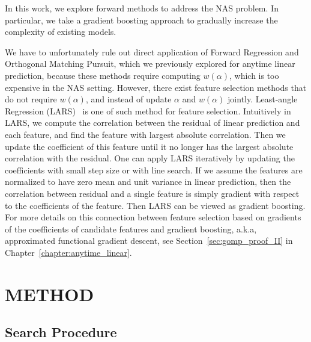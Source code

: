 In this work, we explore forward methods to address the NAS problem. 
In particular, we take a gradient boosting approach to gradually increase the
complexity of existing models. 



We have to unfortunately rule out direct application of Forward Regression and 
Orthogonal Matching Pursuit, which we previously explored for anytime linear prediction, 
because these methods require computing $w(\alpha)$, which is too expensive in the NAS setting. 
However, there exist feature selection methods that do not require $w(\alpha)$,
and instead of update $\alpha$ and $w(\alpha)$ jointly. 
Least-angle Regression (LARS)~\citep{lars} is one of such method for feature selection.
Intuitively in LARS, we compute the correlation between the residual of linear prediction and
each feature, and find the feature with largest absolute correlation. Then we update the 
coefficient of this feature until it no longer has the largest absolute correlation with the residual. 
One can apply LARS iteratively by updating the coefficients with small step size or with line search. 
If we assume the features are normalized to have zero mean and unit variance in linear prediction, 
then the correlation between residual and a single feature is simply gradient with respect to the 
coefficients of the feature. Then LARS can be viewed as gradient boosting. For more details on
this connection between feature selection based on gradients of the coefficients of candidate features and 
gradient boosting, a.k.a, approximated functional gradient descent, see Section~\ref{sec:gomp_proof_II} in 
Chapter~\ref{chapter:anytime_linear}. 






\section{METHOD}






\subsection{Search Procedure}
\label{sec:search_procedure}



